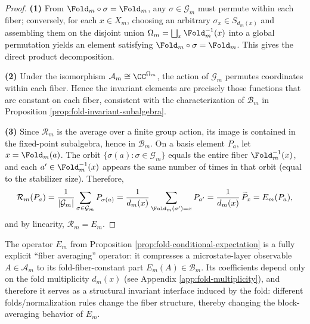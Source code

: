 \begin{proof}
\textbf{(1)} From \(\Fold_m\circ\sigma=\Fold_m\), any \(\sigma\in\mathcal{G}_m\) must permute within each fiber; conversely, for each \(x\in X_m\), choosing an arbitrary \(\sigma_x\in S_{d_m(x)}\) and assembling them on the disjoint union \(\Omega_m=\bigsqcup_x \Fold_m^{-1}(x)\) into a global permutation yields an element satisfying \(\Fold_m\circ\sigma=\Fold_m\). This gives the direct product decomposition.
\par
\textbf{(2)} Under the isomorphism \(\mathcal{A}_m\cong \CC^{\Omega_m}\), the action of \(\mathcal{G}_m\) permutes coordinates within each fiber. Hence the invariant elements are precisely those functions that are constant on each fiber, consistent with the characterization of \(\mathcal{B}_m\) in Proposition \ref{prop:fold-invariant-subalgebra}.
\par
\textbf{(3)} Since \(\mathcal{R}_m\) is the average over a finite group action, its image is contained in the fixed-point subalgebra, hence in \(\mathcal{B}_m\). On a basis element \(P_a\), let \(x=\Fold_m(a)\). The orbit \(\{\sigma(a):\sigma\in\mathcal{G}_m\}\) equals the entire fiber \(\Fold_m^{-1}(x)\), and each \(a'\in \Fold_m^{-1}(x)\) appears the same number of times in that orbit (equal to the stabilizer size). Therefore,
\[
\mathcal{R}_m(P_a)
=\frac{1}{|\mathcal{G}_m|}\sum_{\sigma\in\mathcal{G}_m}P_{\sigma(a)}
=\frac{1}{d_m(x)}\sum_{\Fold_m(a')=x}P_{a'}
=\frac{1}{d_m(x)}\,\widetilde P_x
=E_m(P_a),
\]
and by linearity, \(\mathcal{R}_m=E_m\). \qedhere
\end{proof}

\begin{remark}
\label{rem:fold-expectation-interface}
The operator $E_m$ from Proposition \ref{prop:fold-conditional-expectation} is a fully explicit ``fiber averaging'' operator: it compresses a microstate-layer observable $A\in\mathcal{A}_m$ to its fold-fiber-constant part $E_m(A)\in\mathcal{B}_m$. Its coefficients depend only on the fold multiplicity $d_m(x)$ (see Appendix \ref{app:fold-multiplicity}), and therefore it serves as a structural invariant interface induced by the fold: different folds/normalization rules change the fiber structure, thereby changing the block-averaging behavior of $E_m$.
\end{remark}

